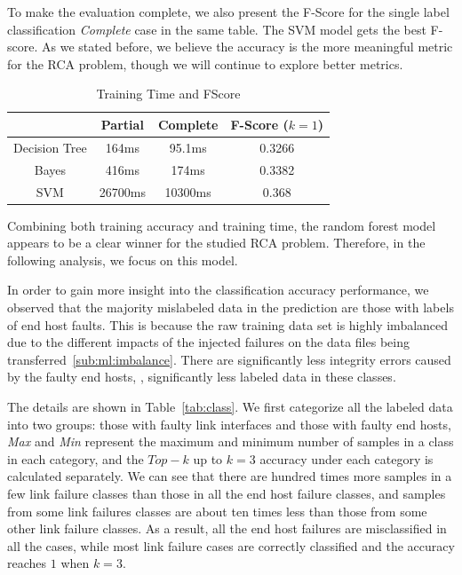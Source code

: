 To make the evaluation complete, we also present the F-Score for the single label classification {\it Complete} case in the same table. The SVM model gets the best F-score. As we stated before, we believe the accuracy is the more meaningful metric for the RCA problem, though we will continue to explore better metrics.     
\begin{table}[!ht]
\caption{Training Time and F\-Score}
\label{tab:time}
\begin{center}
\begin{tabular}{ |c|c|c|c| } 
 \hline
  & Partial & Complete & F-Score ($k=1$)\\ 
 \hline\hline
 Decision Tree & 164ms & 95.1ms & 0.3266\\ 
 \hline
 Bayes & 416ms & 174ms & 0.3382 \\
 \hline
 SVM & 26700ms & 10300ms & 0.368 \\ 
 \hline
\end{tabular}
\end{center}
\end{table}
Combining both training accuracy and training time, the random forest model appears to be a clear winner for the studied RCA problem. Therefore, in the following analysis, we focus on this model.

In order to gain more insight into the classification accuracy performance, we observed that the majority mislabeled data in the prediction are those with labels of end host faults.  This is because the raw training data set is highly imbalanced due to the different impacts of the injected failures on the data files being transferred~\ref{sub:ml:imbalance}. There are significantly less integrity errors caused by the faulty end hosts, \ie, significantly less labeled data in these classes.

The details are shown in Table~\ref{tab:class}. We first categorize all the labeled data into two groups: those with faulty link interfaces and those with faulty end hosts, {\it Max} and {\it Min} represent the maximum and minimum number of samples in a class in each category, and the $Top-k$ up to $k=3$ accuracy under each category is calculated separately. We can see that there are hundred times more samples in a few link failure classes than those in all the end host failure classes, and samples from some link failures classes are about ten times less than those from some other link failure classes. As a result, all the end host failures are misclassified in all the cases, while most link failure cases are correctly classified and the accuracy reaches $1$ when $k=3$.

